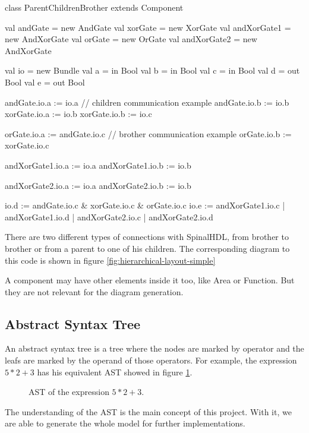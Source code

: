 \begin{listing}
    \centering
    \begin{scalacode}
    class ParentChildrenBrother extends Component
    {
        val andGate = new AndGate
        val xorGate = new XorGate
        val andXorGate1 = new AndXorGate
        val orGate = new OrGate
        val andXorGate2 = new AndXorGate

        val io = new Bundle
        {
            val a = in Bool
            val b = in Bool
            val c = in Bool
            val d = out Bool
            val e = out Bool
        }

        andGate.io.a := io.a            // children communication example
        andGate.io.b := io.b
        xorGate.io.a := io.b
        xorGate.io.b := io.c

        orGate.io.a := andGate.io.c     // brother communication example
        orGate.io.b := xorGate.io.c     

        andXorGate1.io.a := io.a
        andXorGate1.io.b := io.b

        andXorGate2.io.a := io.a
        andXorGate2.io.b := io.b

        io.d := andGate.io.c & xorGate.io.c & orGate.io.c
        io.e := andXorGate1.io.c | andXorGate1.io.d | andXorGate2.io.c | andXorGate2.io.d
    }
    \end{scalacode}
    \caption[Type of connection in SpinalHDL]{There are two different types of
connections with SpinalHDL, from brother to brother or from a parent to
one of his children. The corresponding diagram to this code is shown in figure
\ref{fig:hierarchical-layout-simple}}
    \label{lst:HierarchicComponent-solo}
\end{listing}

A component may have other elements inside it too, like Area or Function. But
they are not relevant for the diagram generation.

\subsection{Abstract Syntax Tree}
\label{sub:Abstract Syntax Tree}

An abstract syntax tree is a tree where the nodes are marked by operator and the
leafs are marked by the operand of those operators. For example, the expression $5
* 2 + 3$ has his equivalent AST showed in figure \ref{fig:ast-example}.

\begin{figure}[H]
    \centering
    \caption[Example of an AST]{AST of the expression $5 * 2 + 3$.}
    \label{fig:ast-example}
  \end{figure}

The understanding of the AST is the main concept of this project. With it, we are
able to generate the whole model for further implementations.

